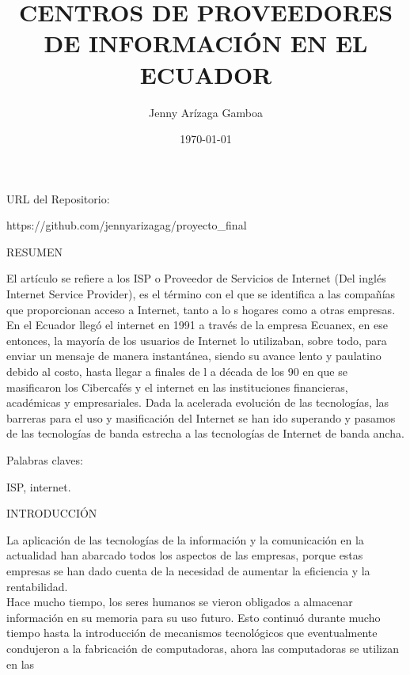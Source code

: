 \documentclass[a4paper,11pt]{article}
\begin{document}
\title{CENTROS DE PROVEEDORES DE INFORMACIÓN EN EL ECUADOR}
\author{Jenny Arízaga Gamboa}
\date{\today}
\maketitle
\begin{bf}
URL del Repositorio:
\end{bf}
https://github.com/jennyarizagag/proyecto\_final
\begin{bf}
\begin{center}
RESUMEN \\
\end{center}
\end{bf}
El artículo se refiere a los ISP o Proveedor de Servicios de Internet (Del inglés Internet Service Provider),
es el término con el que se identifica a las compañías que proporcionan acceso a Internet, tanto a lo
s hogares como a otras empresas. En el Ecuador llegó el internet en 1991 a través de la empresa Ecuanex,
en ese entonces, la mayoría de los usuarios de Internet lo utilizaban, sobre todo, para enviar un mensaje 
de manera instantánea, siendo su avance lento y paulatino debido al costo, hasta llegar a finales de l
a década de los 90 en que se masificaron los Cibercafés y el internet en las instituciones financieras, 
académicas y empresariales. Dada la acelerada evolución de las tecnologías, las barreras para el uso 
y masificación del Internet se han ido superando y pasamos de las tecnologías de banda estrecha a las 
tecnologías de Internet de banda ancha.\\   
\begin{bf}
Palabras claves:
\end{bf}
ISP, internet. \\
\begin{bf}
\begin{center}
INTRODUCCI\'ON\\
\end{center}
\end{bf}
La aplicaci\'on de las tecnolog\'ias de la informaci\'on y la comunicaci\'on en la actualidad han abarcado 
todos los aspectos de las empresas, porque estas empresas se han dado cuenta de la necesidad de aumentar 
la eficiencia y la rentabilidad.\\
Hace mucho tiempo, los seres humanos se vieron obligados a almacenar informaci\'on en su memoria para su 
uso futuro. Esto continu\'o durante mucho tiempo hasta la introducci\'on de mecanismos tecnol\'ogicos que 
eventualmente condujeron a la fabricaci\'on de computadoras, ahora las computadoras se utilizan en las 
\end{document}
